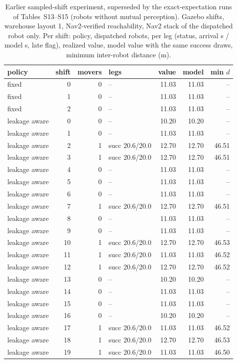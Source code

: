 \begin{table}[h]\centering\caption{Earlier sampled-shift experiment, superseded by the exact-expectation runs of Tables~S13--S15 (robots without mutual perception). Gazebo shifts, warehouse layout 1, Nav2-verified reachability, Nav2 stack of the dispatched robot only. Per shift: policy, dispatched robots, per leg (status, arrival s / model s, late flag), realized value, model value with the same success draws, minimum inter-robot distance (m).}\scriptsize
\begin{tabular}{@{}lrrp{3.9cm}rrr@{}}\toprule policy & shift & movers & legs & value & model & min $d$\\\midrule
fixed & 0 & 0 & -- & 11.03 & 11.03 & --\\
fixed & 1 & 0 & -- & 11.03 & 11.03 & --\\
fixed & 2 & 0 & -- & 11.03 & 11.03 & --\\
leakage aware & 0 & 0 & -- & 10.20 & 10.20 & --\\
leakage aware & 1 & 0 & -- & 11.03 & 11.03 & --\\
leakage aware & 2 & 1 & succ 20.6/20.0 & 12.70 & 12.70 & 46.51\\
leakage aware & 3 & 1 & succ 20.6/20.0 & 12.70 & 12.70 & 46.51\\
leakage aware & 4 & 0 & -- & 11.03 & 11.03 & --\\
leakage aware & 5 & 0 & -- & 11.03 & 11.03 & --\\
leakage aware & 6 & 0 & -- & 11.03 & 11.03 & --\\
leakage aware & 7 & 1 & succ 20.6/20.0 & 12.70 & 12.70 & 46.51\\
leakage aware & 8 & 0 & -- & 11.03 & 11.03 & --\\
leakage aware & 9 & 0 & -- & 11.03 & 11.03 & --\\
leakage aware & 10 & 1 & succ 20.6/20.0 & 12.70 & 12.70 & 46.53\\
leakage aware & 11 & 1 & succ 20.6/20.0 & 11.03 & 11.03 & 46.52\\
leakage aware & 12 & 1 & succ 20.6/20.0 & 12.70 & 12.70 & 46.52\\
leakage aware & 13 & 0 & -- & 10.20 & 10.20 & --\\
leakage aware & 14 & 0 & -- & 11.03 & 11.03 & --\\
leakage aware & 15 & 0 & -- & 11.03 & 11.03 & --\\
leakage aware & 16 & 0 & -- & 10.20 & 10.20 & --\\
leakage aware & 17 & 1 & succ 20.6/20.0 & 11.03 & 11.03 & 46.52\\
leakage aware & 18 & 1 & succ 20.6/20.0 & 12.70 & 12.70 & 46.53\\
leakage aware & 19 & 1 & succ 20.6/20.0 & 11.03 & 11.03 & 46.50\\
\bottomrule\end{tabular}\end{table}
